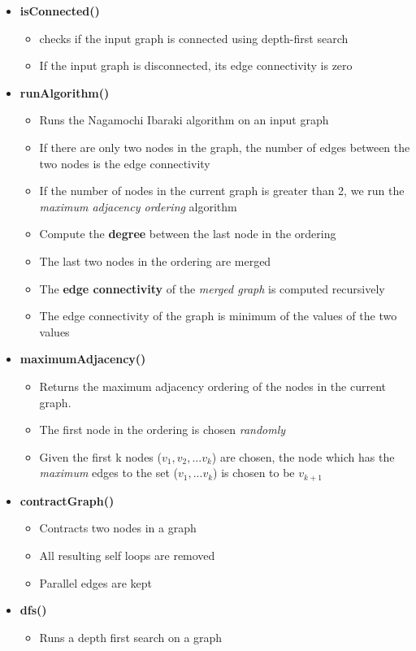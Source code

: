 \documentclass[12pt,letterpaper,titlepage,en-US]{article}
\begin{document}
\begin{itemize}

\item \textbf{isConnected()} 
\begin{itemize}
\item checks if the input graph is connected using depth-first search
\item If the input graph is disconnected, its edge connectivity is zero
\end{itemize}


\item \textbf{runAlgorithm()}
\begin{itemize}
\item Runs the Nagamochi Ibaraki algorithm on an input graph
\item If there are only two nodes in the graph, the number of edges between the two nodes is the edge connectivity
\item If the number of nodes in the current graph is greater than 2, we run the \textit{maximum adjacency ordering} algorithm
\item Compute the \textbf{degree} between the last node in the ordering
\item The last two nodes in the ordering are merged
\item The \textbf{edge connectivity} of the \textit{merged graph} is computed recursively
\item The edge connectivity of the graph is minimum of the values of the two values

\end{itemize}





\item \textbf{maximumAdjacency()}
\begin{itemize}
\item Returns the maximum adjacency ordering of the nodes in the current graph.
\item The first node in the ordering is chosen \textit{randomly}
\item Given the first k nodes ($v_{1},v_{2},...v_{k}$) are chosen, the node which has the \textit{maximum} edges to the set ($v_{1},...v_{k}$) is chosen to be $v_{k+1}$
\end{itemize}


\item \textbf{contractGraph()}
\begin{itemize}
\item Contracts two nodes in a graph
\item All resulting self loops are removed 
\item Parallel edges are kept
\end{itemize}


\item \textbf{dfs()}
\begin{itemize}
\item Runs a depth first search on a graph
\end{itemize}



\end{itemize}
\end{document}

